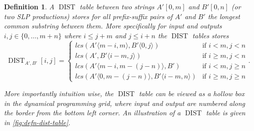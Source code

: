 \documentclass[twoside,11pt,openright]{report}
\newcommand{\DIST}{\operatorname{DIST}}
\newcommand{\substr}[3]{#1\langle #2, #3 \rangle}
\newcommand{\str}[3]{#1[#2, #3]}
\newtheorem{mydef}{Definition}
\begin{document}
\begin{mydef}
  \label{defn:dist-table}
  A $\DIST$ table between two strings $\str{A'}{0}{m}$ and $\str{B'}{0}{n}$ (or two SLP productions) stores for all prefix-suffix pairs of $A'$ and $B'$ the longest common substring between them. More specifically for input and outputs $i, j \in \{0, \dots, m + n\}$ where $i \leq j + m$ and $j \leq i + n$ the $\DIST$ tables stores
  \[
    \DIST_{A',B'}[i, j] = \left\{
    \begin{array}{ll}
      lcs(\substr{A'}{m - i}{m}, \substr{B'}{0}{j})             & \text{if } i < m, j < n \\
      lcs(A', \substr{B'}{i - m}{j})                            & \text{if } i \geq m, j < n \\
      lcs(\substr{A'}{m - i}{m - (j - n)}, B')                  & \text{if } i < m, j \geq n \\
      lcs(\substr{A'}{0}{m - (j - n)}, \substr{B'}{i - m}{n})   & \text{if } i \geq m, j \geq n
    \end{array}
  \right. .
  \]

  More importantly intuition wise, the $\DIST$ table can be viewed as a hollow box in the dynamical programming grid, where input and output are numbered along the border from the bottom left corner. An illustration of a $\DIST$ table is given in \cref{fig:defn-dist-table}.


\end{mydef}
\end{document}
